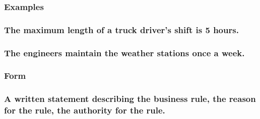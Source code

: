 \documentclass[
]{article}
\begin{document}
\hypertarget{examples-10}{%
\subsubsection{\texorpdfstring{Examples
}{Examples }}\label{examples-10}}

\hypertarget{the-maximum-length-of-a-truck-drivers-shift-is-5-hours.}{%
\subsubsection{The maximum length of a truck driver's shift is 5
hours.}\label{the-maximum-length-of-a-truck-drivers-shift-is-5-hours.}}

\hypertarget{the-engineers-maintain-the-weather-stations-once-a-week.}{%
\subsubsection{The engineers maintain the weather stations once a
week.}\label{the-engineers-maintain-the-weather-stations-once-a-week.}}

\hypertarget{form-18}{%
\subsubsection{Form}\label{form-18}}

\hypertarget{a-written-statement-describing-the-business-rule-the-reason-for-the-rule-the-authority-for-the-rule.}{%
\subsubsection{A written statement describing the business rule, the
reason for the rule, the authority for the
rule.}\label{a-written-statement-describing-the-business-rule-the-reason-for-the-rule-the-authority-for-the-rule.}}
\end{document}
